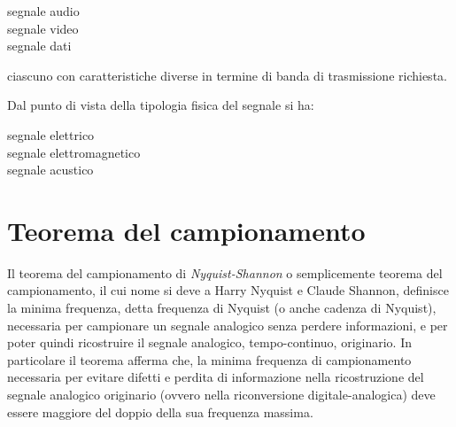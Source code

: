 \begin{description}
\item[segnale audio]
\item[segnale video]
\item[segnale dati]
\end{description}

ciascuno con caratteristiche diverse in termine di banda di trasmissione richiesta.

Dal punto di vista della tipologia fisica del segnale si ha:

\begin{description}
\item[segnale elettrico]
\item[segnale elettromagnetico]
\item[segnale acustico]
\end{description}

%

\clearpage

\section{Teorema del campionamento}

Il teorema del campionamento di \emph{Nyquist-Shannon} o semplicemente teorema del
campionamento, il cui nome si deve a Harry Nyquist e
Claude Shannon, definisce la minima frequenza, detta
frequenza di Nyquist (o anche cadenza di Nyquist), necessaria per campionare un
segnale analogico senza perdere informazioni, e per poter quindi ricostruire il
segnale analogico, tempo-continuo, originario.
In particolare il teorema afferma che,
la minima frequenza di campionamento necessaria per evitare difetti e perdita di
informazione nella ricostruzione del segnale analogico originario (ovvero nella
riconversione digitale-analogica) deve essere maggiore del doppio della sua
frequenza massima.

